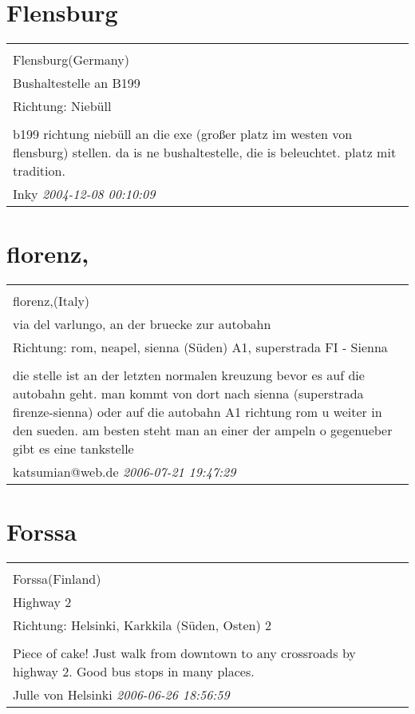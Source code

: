 \documentclass[a4paper,12pt]{article}
\begin{document}
\section{Flensburg}
\begin{tabular}{|p{13cm}|}
\hline\\
Flensburg(Germany)\\
Bushaltestelle an B199\\
Richtung: Niebüll \\
\hline\\
b199 richtung niebüll an die exe (großer platz im westen von flensburg) stellen. da is ne bushaltestelle, die is beleuchtet. platz mit tradition. \\
Inky \textit{ 2004-12-08 00:10:09 }\\\hline
\end{tabular}


\section{florenz,}
\begin{tabular}{|p{13cm}|}
\hline\\
florenz,(Italy)\\
via del varlungo, an der bruecke zur autobahn\\
Richtung: rom, neapel, sienna (Süden) A1, superstrada FI - Sienna \\
\hline\\
die stelle ist an der letzten normalen kreuzung bevor es auf die autobahn geht. man kommt von dort nach sienna (superstrada firenze-sienna) oder auf die autobahn A1 richtung rom u weiter in den sueden. am besten steht man an einer der ampeln o gegenueber gibt es eine tankstelle \\
katsumian@web.de \textit{ 2006-07-21 19:47:29 }\\\hline
\end{tabular}


\section{Forssa}
\begin{tabular}{|p{13cm}|}
\hline\\
Forssa(Finland)\\
Highway 2\\
Richtung: Helsinki, Karkkila (Süden, Osten) 2 \\
\hline\\
Piece of cake! Just walk from downtown to any crossroads by highway 2. Good bus stops in many places. \\
Julle von Helsinki \textit{ 2006-06-26 18:56:59 }\\\hline
\end{tabular}
\end{document}
